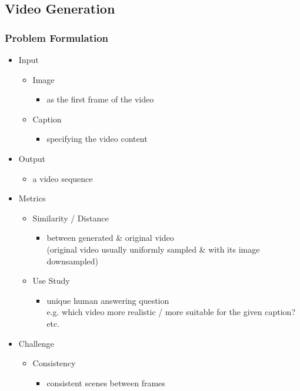\subsection{Video Generation}
\subsubsection{Problem Formulation}
\begin{itemize}
\item Input
	\begin{itemize}
	\item Image
		\begin{itemize}
		\item as the first frame of the video
		\end{itemize}
	\item Caption
		\begin{itemize}
		\item specifying the video content
		\end{itemize}
	\end{itemize}
\item Output
	\begin{itemize}
	\item a video sequence
	\end{itemize}
\item Metrics
	\begin{itemize}
	\item Similarity / Distance
		\begin{itemize}
		\item between generated \& original video \\
		(original video usually uniformly sampled \& with its image downsampled)
		\end{itemize}
	\item Use Study
		\begin{itemize}
		\item unique human answering question \\
		e.g. which video more realistic / more suitable for the given caption? etc.
		\end{itemize}
	\end{itemize}
\item Challenge
	\begin{itemize}
	\item Consistency
		\begin{itemize}
		\item consistent scenes between frames
		\end{itemize}

\end{itemize}
\end{itemize}

